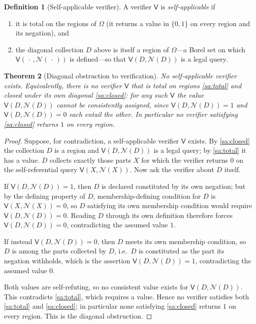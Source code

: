 \documentclass[11pt,twocolumn,a4paper]{article}
\theoremstyle{thmstyle}
\newtheorem{theorem}{Theorem}[section]
\theoremstyle{definition}
\newtheorem{definition}[theorem]{Definition}
\theoremstyle{remark}
\newcommand{\Space}{\Omega}
\newcommand{\Neg}{\mathcal{N}}
\newcommand{\Ver}{\mathsf{V}}
\begin{document}
\begin{definition}[Self-applicable verifier]
\label{def:self-applicable}
A verifier $\Ver$ is \emph{self-applicable} if
\begin{enumerate}[label=\textup{(SA\arabic*)},leftmargin=3em]
\item\label{sa:total} it is total on the regions of $\Space$ (it returns a value
in $\{0,1\}$ on every region and its negation), and
\item\label{sa:closed} the diagonal collection $D$ above is itself a region of
$\Space$---a Borel set on which $\Ver(\,\cdot\,,\Neg(\,\cdot\,))$ is defined---so
that $\Ver(D,\Neg(D))$ is a legal query.
\end{enumerate}
\end{definition}

\begin{theorem}[Diagonal obstruction to verification]
\label{thm:diagonal}
No self-applicable verifier exists. Equivalently, there is no verifier $\Ver$
that is total on regions \ref{sa:total} and closed under its own diagonal
\ref{sa:closed}: for any such $\Ver$ the value $\Ver(D,\Neg(D))$ cannot be
consistently assigned, since $\Ver(D,\Neg(D))=1$ and $\Ver(D,\Neg(D))=0$ each
entail the other. In particular no verifier satisfying \ref{sa:closed} returns
$1$ on every region.
\end{theorem}

\begin{proof}
Suppose, for contradiction, a self-applicable verifier $\Ver$ exists. By
\ref{sa:closed} the collection $D$ is a region and $\Ver(D,\Neg(D))$ is a legal
query; by \ref{sa:total} it has a value. $D$ collects exactly those parts $X$ for
which the verifier returns $0$ on the self-referential query $\Ver(X,\Neg(X))$.
Now ask the verifier about $D$ itself.

If $\Ver(D,\Neg(D))=1$, then $D$ is declared constituted by its own negation;
but by the defining property of $D$, membership-defining condition for $D$ is
$\Ver(X,\Neg(X))=0$, so $D$ satisfying its own membership condition would require
$\Ver(D,\Neg(D))=0$. Reading $D$ through its own definition therefore forces
$\Ver(D,\Neg(D))=0$, contradicting the assumed value $1$.

If instead $\Ver(D,\Neg(D))=0$, then $D$ meets its own membership condition, so
$D$ is among the parts collected by $D$, i.e.\ $D$ is constituted as the part its
negation withholds, which is the assertion $\Ver(D,\Neg(D))=1$, contradicting the
assumed value $0$.

Both values are self-refuting, so no consistent value exists for
$\Ver(D,\Neg(D))$. This contradicts \ref{sa:total}, which requires a value. Hence
no verifier satisfies both \ref{sa:total} and \ref{sa:closed}; in particular none
satisfying \ref{sa:closed} returns $1$ on every region. This is the diagonal
obstruction.
\end{proof}
\end{document}
